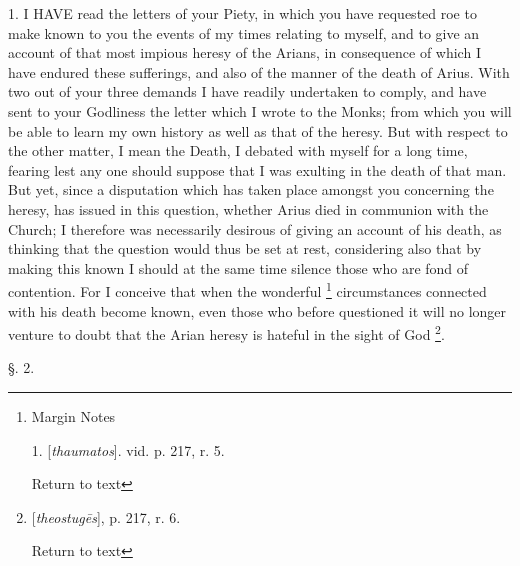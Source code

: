 1. I HAVE
read the letters of your Piety, in which you have requested roe to
make known to you the events of my times relating to myself, and
to give an account of that most impious heresy of the Arians, in
consequence of which I have endured these sufferings, and also of the
manner of the death of Arius. With two out of your three demands I
have readily undertaken to comply, and have sent to your Godliness the
letter which I wrote to the Monks; from which you will be able to
learn my own history as well as that of the heresy. But with respect
to the other matter, I mean the Death, I debated with myself for a
long time, fearing lest any one should suppose that I was exulting in
the death of that man. But yet, since a disputation which has taken
place amongst you concerning the heresy, has issued in this question,
whether Arius died in communion with the Church; I therefore was
necessarily desirous of giving an account of his death, as thinking
that the question would thus be set at rest, considering also that by
making this known I should at the same time silence those who are fond
of contention. For I conceive that when the wonderful \footnote{Margin Notes

1. [\emph{thaumatos}]. vid. p. 217, r. 5.

Return to text} circumstances connected with his death become known, even those
who before questioned it will no longer venture to doubt that the
Arian heresy is hateful in the sight of God \footnote{[\emph{theostug\={e}s}], p. 217, r. 6.

Return to text}.

§. 2.


